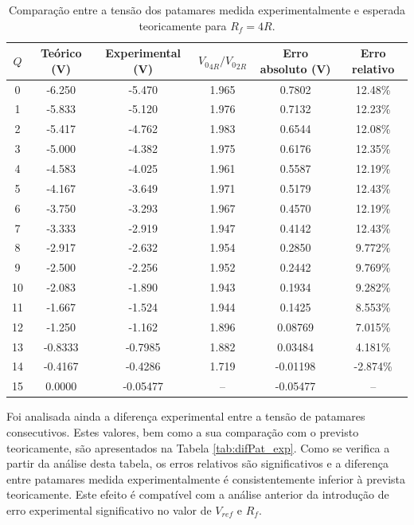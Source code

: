 \documentclass[a4paper, oneside]{article}
\begin{document}
\begin{table}[ht]
	\centering
	\caption{Comparação entre a tensão dos patamares medida experimentalmente e esperada teoricamente para $R_f = 4R$.}
	\label{tab:Pat4R_exp}
	\begin{tabular}{cccccc}
		$Q$ & Teórico (V) & Experimental (V) & ${V_0}_{4R}/{V_0}_{2R}$ & Erro absoluto (V) & Erro relativo\\
		\hline
		0 & -6.250 & -5.470 & 1.965 & 0.7802 & 12.48\%\\ 
		1 & -5.833 & -5.120 & 1.976 & 0.7132 & 12.23\%\\ 
		2 & -5.417 & -4.762 & 1.983 & 0.6544 & 12.08\%\\ 
		3 & -5.000 & -4.382 & 1.975 & 0.6176 & 12.35\%\\ 
		4 & -4.583 & -4.025 & 1.961 & 0.5587 & 12.19\%\\ 
		5 & -4.167 & -3.649 & 1.971 & 0.5179 & 12.43\%\\ 
		6 & -3.750 & -3.293 & 1.967 & 0.4570 & 12.19\%\\ 
		7 & -3.333 & -2.919 & 1.947 & 0.4142 & 12.43\%\\ 
		8 & -2.917 & -2.632 & 1.954 & 0.2850 & 9.772\%\\ 
		9 & -2.500 & -2.256 & 1.952 & 0.2442 & 9.769\%\\ 
		10 & -2.083 & -1.890 & 1.943 & 0.1934 & 9.282\%\\ 
		11 & -1.667 & -1.524 & 1.944 & 0.1425 & 8.553\%\\ 
		12 & -1.250 & -1.162 & 1.896 & 0.08769 & 7.015\%\\ 
		13 & -0.8333 & -0.7985 & 1.882 & 0.03484 & 4.181\%\\ 
		14 & -0.4167 & -0.4286 & 1.719 & -0.01198 & -2.874\%\\ 
		15 & 0.0000 & -0.05477 & -- & -0.05477 & --  \\
		\hline
	\end{tabular}
\end{table}

Foi analisada ainda a diferença experimental entre a tensão de patamares consecutivos. Estes valores, bem como a sua comparação com o previsto teoricamente, são apresentados na Tabela \ref{tab:difPat_exp}. Como se verifica a partir da análise desta tabela, os erros relativos são significativos e a diferença entre patamares medida experimentalmente é consistentemente inferior à prevista teoricamente. Este efeito é compatível com a análise anterior da introdução de erro experimental significativo no valor de $V_{ref}$ e $R_f$.
\end{document}
